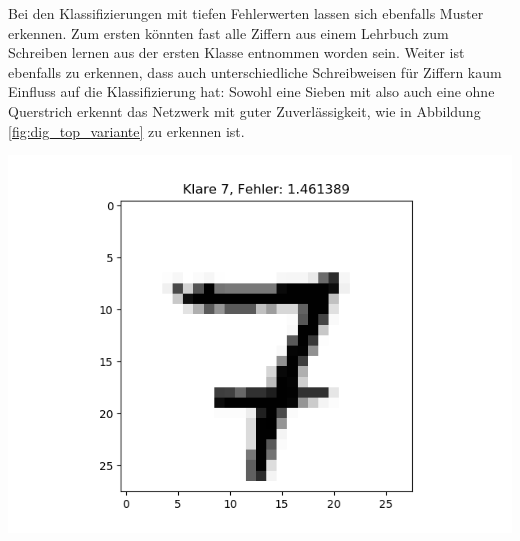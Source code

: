 \documentclass[Interploate_hadwritten_Digits.tex]{subfiles}
\begin{document}
	Bei den Klassifizierungen mit tiefen Fehlerwerten lassen sich ebenfalls Muster erkennen. Zum ersten könnten fast alle Ziffern aus einem Lehrbuch zum Schreiben lernen aus der ersten Klasse entnommen worden sein. Weiter ist ebenfalls zu erkennen, dass auch unterschiedliche Schreibweisen für Ziffern kaum Einfluss auf die Klassifizierung hat: Sowohl eine Sieben mit also auch eine ohne Querstrich erkennt das Netzwerk mit guter Zuverlässigkeit, wie in Abbildung \ref{fig:dig_top_variante} zu erkennen ist.
	\begin{Figure}
		\centering
		\includegraphics[width=\linewidth]{img/classification_analysis/clear_7_1}
		\label{fig:dig_top_variante}
	\end{Figure}
\end{document}
